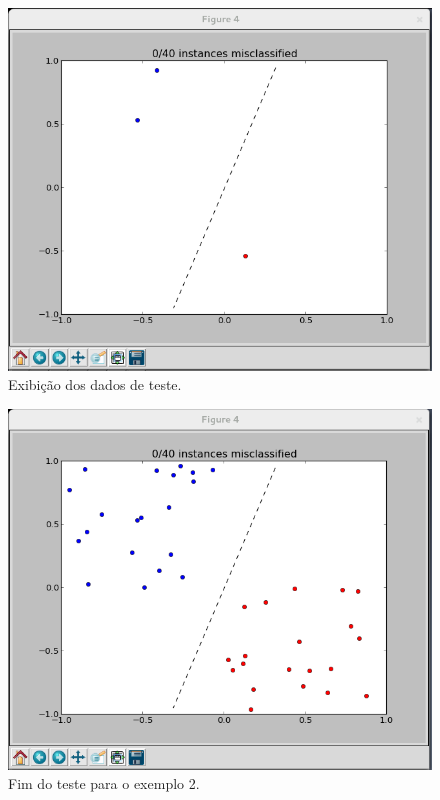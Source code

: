 \documentclass[brazil, a4paper]{article}
\begin{document}
\begin{description}
\newpage

\begin{figure}[!htb]
\centering
\includegraphics[scale=0.42]{ex2-t2.png}
\caption{Exibição dos dados de teste.}
\end{figure}

\begin{figure}[!htb]
\centering
\includegraphics[scale=0.42]{ex2-t3.png}
\caption{Fim do teste para o exemplo 2.}
\end{figure}


\end{description}
\end{document}
